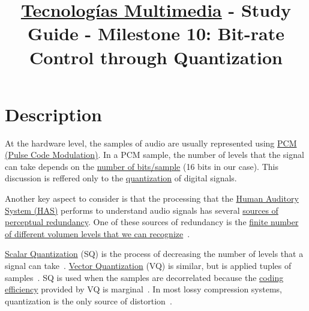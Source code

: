 \title{\href{https://www.ual.es/estudios/grados/presentacion/plandeestudios/asignatura/4015/40154321?idioma=zh_CN}{Tecnologías Multimedia} - Study Guide - Milestone 10: Bit-rate Control through Quantization}

\maketitle

\section{Description}

At the hardware level, the samples of audio are usually represented
using \href{https://en.wikipedia.org/wiki/Pulse-code_modulation}{PCM
  (Pulse Code Modulation)}. In a PCM sample, the number of levels that
the signal can take depends on the
\href{https://en.wikipedia.org/wiki/Audio_bit_depth}{number of
  bits/sample} (16 bits in our case). This discussion is reffered only
to the
\href{https://en.wikipedia.org/wiki/Quantization_(signal_processing)}{quantization}
of digital signals.

Another key aspect to consider is that the processing that the
\href{https://en.wikipedia.org/wiki/Auditory_system}{Human Auditory
  System (HAS)} performs to understand audio signals has several
\href{https://en.wikipedia.org/wiki/Psychoacoustics}{sources of
  perceptual redundancy}. One of these sources of redundancy is the
\href{https://en.wikipedia.org/wiki/Equal-loudness_contour}{finite
  number of different volumen levels that we can recognize}~\cite{bosi2003intro}.

\href{https://en.wikipedia.org/wiki/Quantization_(signal_processing}{Scalar
  Quantization} (SQ) is the process of decreasing the number of levels
that a signal can
take~\cite{sayood2017introduction}. \href{https://en.wikipedia.org/wiki/Vector_quantization}{Vector
  Quantization} (VQ) is similar, but is applied tuples of
samples~\cite{foundationsofsignalprocessing}. SQ is used when the
samples are decorrelated because the
\href{https://en.wikipedia.org/wiki/Quantization_(signal_processing)#Rate%E2%80%93distortion_optimization}{coding
  efficiency} provided by VQ is
marginal~\cite{vetterli2014foundations}. In most lossy compression
systems, quantization is the only source of
distortion~\cite{taubman2012jpeg2000}.

